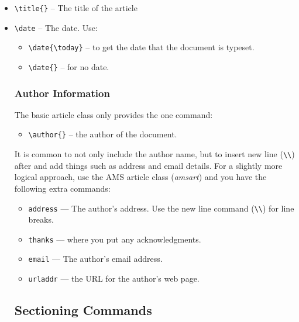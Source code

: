 \documentclass{article}
\begin{document}
\begin{itemize}
\item \verb|\title{}| -- The title of the article
\item \verb|\date| -- The date. Use:
  \begin{itemize}
  \item \verb|\date{\today}| -- to get the date that the document is typeset.
  \item \verb|\date{}| -- for no date.
  \end{itemize}
  
\subsubsection{Author Information}
\label{sec:author-information}

The basic article class only provides the one command:
\begin{itemize}
\item \verb|\author{}| -- the author of the document.
\end{itemize}
It is common to not only include the author name, but to insert new line (\verb|\\|) after and add things such as address and email details. For a slightly more logical approach, use the AMS article class (\emph{amsart}) and you have the following extra commands:
\begin{itemize}
\item \verb|address| --- The author's address. Use the new line command (\verb|\\|) for line breaks.
\item \verb|thanks| --- where you put any acknowledgments.
\item \verb|email| --- The author's email address.
\item \verb|urladdr| --- the URL for the author's web page.
\end{itemize}

\subsection{Sectioning Commands}
\label{sec:sectioning-commands}


\end{itemize}
\end{document}
